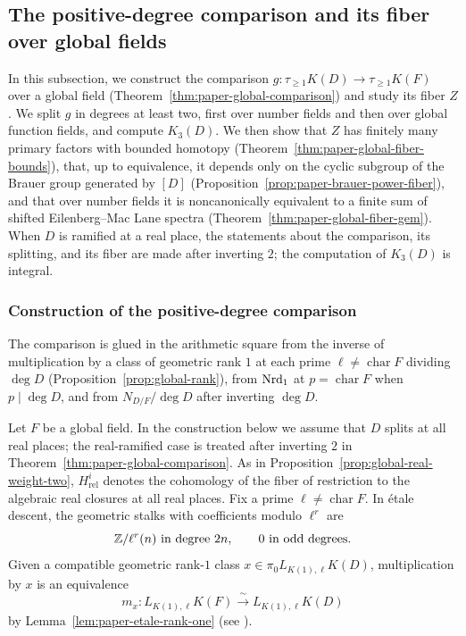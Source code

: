 \subsection{The positive-degree comparison and its fiber over global fields}\label{sec:global-spectrum}
In this subsection, we construct the comparison $g\colon\tau_{\ge1}K(D)\to\tau_{\ge1}K(F)$ over a global field (Theorem~\ref{thm:paper-global-comparison}) and study its fiber $Z$.
We split $g$ in degrees at least two, first over number fields and then over global function fields, and compute $K_3(D)$.
We then show that $Z$ has finitely many primary factors with bounded homotopy (Theorem~\ref{thm:paper-global-fiber-bounds}), that, up to equivalence, it depends only on the cyclic subgroup of the Brauer group generated by $[D]$ (Proposition~\ref{prop:paper-brauer-power-fiber}), and that over number fields it is noncanonically equivalent to a finite sum of shifted Eilenberg--Mac Lane spectra (Theorem~\ref{thm:paper-global-fiber-gem}).
When $D$ is ramified at a real place, the statements about the comparison, its splitting, and its fiber are made after inverting $2$; the computation of $K_3(D)$ is integral.

\subsubsection{Construction of the positive-degree comparison}
The comparison is glued in the arithmetic square from the inverse of multiplication by a class of geometric rank $1$ at each prime $\ell\ne\operatorname{char}F$ dividing $\deg D$ (Proposition~\ref{prop:global-rank}), from $\operatorname{Nrd}_1$ at $p=\operatorname{char}F$ when $p\mid\deg D$, and from $N_{D/F}/\deg D$ after inverting $\deg D$.

Let $F$ be a global field.
In the construction below we assume that $D$ splits at all real places; the real-ramified case is treated after inverting $2$ in Theorem~\ref{thm:paper-global-comparison}.
As in Proposition~\ref{prop:global-real-weight-two}, $H^i_{\mathrm{rel}}$ denotes the cohomology of the fiber of restriction to the algebraic real closures at all real places.
Fix a prime $\ell\ne\operatorname{char}F$.
In \'etale descent, the geometric stalks with coefficients modulo $\ell^r$ are
\[
 \mathbb Z/\ell^r(n)\ \text{in degree }2n,\qquad 0\ \text{in odd degrees}.
\]
Given a compatible geometric rank-$1$ class $x\in\pi_0L_{K(1),\ell}K(D)$, multiplication by $x$ is an equivalence
\[
 m_x\colon L_{K(1),\ell}K(F)\xrightarrow{\ \sim\ }L_{K(1),\ell}K(D)
\]
by Lemma~\ref{lem:paper-etale-rank-one} (see \cite[Theorems 6.18 and 7.14]{ClausenMathew}).

